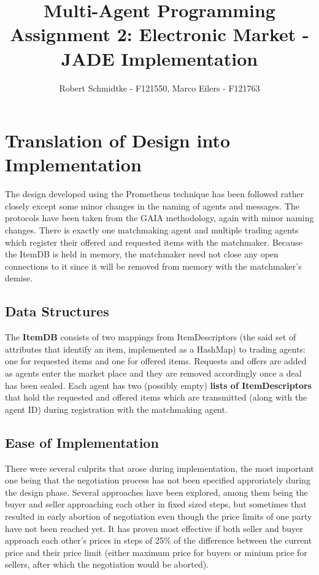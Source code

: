 \documentclass[a4paper,11pt]{article}
\begin{document}
\title{Multi-Agent Programming\\Assignment 2: Electronic Market - JADE Implementation}
\author{Robert Schmidtke - F121550, Marco Eilers - F121763}

\maketitle
\newpage

\section{Translation of Design into Implementation}
The design developed using the Prometheus technique has been followed rather closely except some minor changes in the naming of agents and messages. The protocols have been taken from the GAIA methodology, again with minor naming changes. There is exactly one matchmaking agent and multiple trading agents which register their offered and requested items with the matchmaker. Because the ItemDB is held in memory, the matchmaker need not close any open connections to it since it will be removed from memory with the matchmaker's demise.

\subsection{Data Structures}
The \textbf{ItemDB} consists of two mappings from ItemDescriptors (the said set of attributes that identify an item, implemented as a HashMap) to trading agents: one for requested items and one for offered items. Requests and offers are added as agents enter the market place and they are removed accordingly once a deal has been sealed. Each agent has two (possibly empty) \textbf{lists of ItemDescriptors} that hold the requested and offered items which are transmitted (along with the agent ID) during registration with the matchmaking agent.

\subsection{Ease of Implementation}
There were several culprits that arose during implementation, the most important one being that the negotiation process has not been specified approriately during the design phase. Several approaches have been explored, among them being the buyer and seller approaching each other in fixed sized steps, but sometimes that resulted in early abortion of negotiation even though the price limits of one party have not been reached yet. It has proven most effective if both seller and buyer approach each other's prices in steps of 25\% of the difference between the current price and their price limit (either maximum price for buyers or minium price for sellers, after which the negotiation would be aborted).
\end{document}
